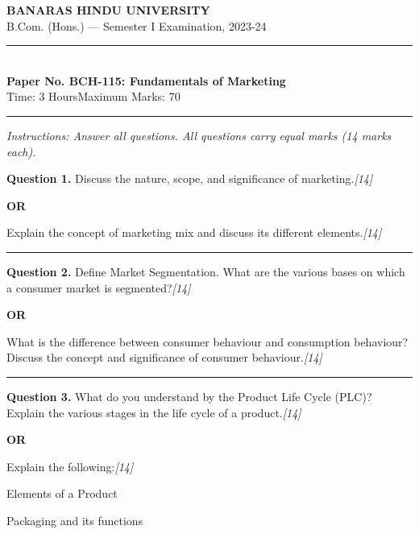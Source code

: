 \documentclass[11pt,a4paper]{article}
\newcommand{\pts}[1]{\hfill   \textit{[#1]}}
\begin{document}
\begin{center}
  {\large\bfseries BANARAS HINDU UNIVERSITY}\\[2pt]
  {\normalsize B.Com. (Hons.) --- Semester I Examination, 2023-24}\\[6pt]
  \rule{0.8\linewidth}{0.5pt}\\[6pt]
  {\large\bfseries Paper No. BCH-115: Fundamentals of Marketing}\\[4pt]
  {\normalsize Time: 3 Hours\hfill Maximum Marks: 70}
\end{center}

\rule{\linewidth}{0.4pt}

\smallskip



\noindent   \textit{Instructions: Answer all questions. All questions carry equal marks (14 marks each).}

\bigskip




\noindent   \textbf{Question 1.}
Discuss the nature, scope, and significance of marketing.\pts{14}

\centerline{   \textbf{OR}}

Explain the concept of marketing mix and discuss its different elements.\pts{14}

\medskip\rule{\linewidth}{0.2pt}




\noindent   \textbf{Question 2.}
Define Market Segmentation. What are the various bases on which a consumer market is segmented?\pts{14}

\centerline{   \textbf{OR}}

What is the difference between consumer behaviour and consumption behaviour? Discuss the concept and significance of consumer behaviour.\pts{14}

\medskip\rule{\linewidth}{0.2pt}




\noindent   \textbf{Question 3.}
What do you understand by the Product Life Cycle (PLC)? Explain the various stages in the life cycle of a product.\pts{14}

\centerline{   \textbf{OR}}

Explain the following:\pts{14}

\begin{parts}
  \item Elements of a Product
  \item Packaging and its functions
\end{parts}
\end{document}
